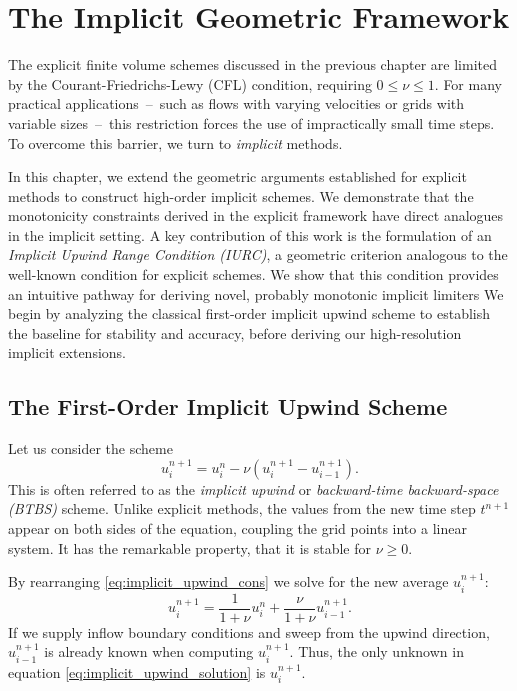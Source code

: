 \chapter{The Implicit Geometric Framework}%
\label{sec:The Implicit Geometric Framework}

The explicit finite volume schemes discussed in the previous chapter are limited by the Courant-Friedrichs-Lewy (CFL) condition, requiring \(0 \leq \nu \leq 1\).
For many practical applications~--~such as flows with varying velocities or grids with variable sizes~--~this restriction forces the use of impractically small time steps.
To overcome this barrier, we turn to \textit{implicit} methods.

In this chapter, we extend the geometric arguments established for explicit methods to construct high-order implicit schemes.
We demonstrate that the monotonicity constraints derived in the explicit framework have direct analogues in the implicit setting.
A key contribution of this work is the formulation of an \textit{Implicit Upwind Range Condition (IURC)}, a geometric criterion analogous to the well-known condition for explicit schemes.
We show that this condition provides an intuitive pathway for deriving novel, probably monotonic implicit limiters
We begin by analyzing the classical first-order implicit upwind scheme to establish the baseline for stability and accuracy, before deriving our high-resolution implicit extensions.

\section{The First-Order Implicit Upwind Scheme}
\label{sec:implicit_upwind}
Let us consider the scheme
\begin{equation}
    \label{eq:implicit_upwind_cons}
    u_{i}^{n+1} = u_{i}^{n} - \nu\left(u_{i}^{n+1} - u_{i-1}^{n+1}\right).
\end{equation}
This is often referred to as the \textit{implicit upwind} or \textit{backward-time backward-space (BTBS)} scheme.
Unlike explicit methods, the values from the new time step \(t^{n+1}\) appear on both sides of the equation, coupling the grid points into a linear system.
It has the remarkable property, that it is stable for \(\nu \geq 0\).


By rearranging \eqref{eq:implicit_upwind_cons} we solve for the new average \(u_{i}^{n+1}\):
\begin{equation}
    \label{eq:implicit_upwind_solution}
    u_{i}^{n+1} = \frac{1}{1+\nu}u_{i}^{n} + \frac{\nu}{1+\nu}u_{i-1}^{n+1}.
\end{equation}
If we supply inflow boundary conditions and sweep from the upwind direction, \(u_{i-1}^{n+1}\) is already known when computing \(u_{i}^{n+1}\).
Thus, the only unknown in equation \eqref{eq:implicit_upwind_solution} is \(u_{i}^{n+1}\).

